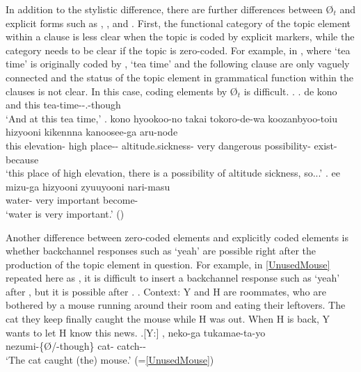 In addition to the stylistic difference,
there are further differences between {\O$_{t}$} and explicit forms such as , , and .
First,
the functional category of the topic element within a clause is less clear when the topic is coded by explicit markers,
while the category needs to be clear
if the topic is zero-coded.
For example, in \Next,
where  `tea time' is originally coded by ,
`tea time' and the following clause are only vaguely connected
and the status of the topic element in grammatical function within the clauses is not clear.
In this case, coding elements by {\O$_{t}$} is difficult.
%
\ex. \ag. de kono  \\
		and this tea-time--.-though \\
		`And at this tea time,'
	\bg. kono hyookoo-no {takai} {tokoro-de-wa} koozanbyoo-toiu hizyooni {kikennna} {kanoosee-ga} aru-node \\
		this elevation- high place-- altitude.sickness- very dangerous possibility- exist-because \\
		`this place of high elevation, there is a possibility of altitude sickness, so...'
	\bg. ee {mizu-ga} hizyooni zyuuyooni nari-masu \\
		 water- very important become- \\
		`water is very important.'
		 \hfill{()}



Another difference between zero-coded elements and explicitly coded elements is whether backchannel responses such as  `yeah' are possible right after the production of the topic element in question.
For example, in \ref{UnusedMouse} repeated here as \Next,
it is difficult to insert a backchannel response such as  `yeah' after ,
but it is possible after .
%
\ex. Context: Y and H are roommates,
	who are bothered by a mouse running around their room
	and eating their leftovers.
	The cat they keep finally caught the mouse while H was out.
	When H is back, Y wants to let H know this news.
	\ag.[Y:] , neko-ga tukamae-ta-yo \\
		nezumi-\{{\O}/-though\} cat- catch-- \\
		`The cat caught (the) mouse.' \hfill{(=\ref{UnusedMouse})}

